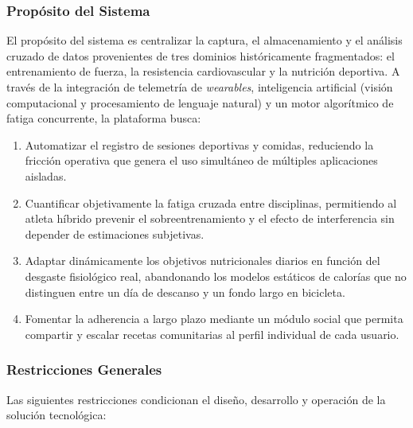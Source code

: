 \documentclass[12pt]{article}
\begin{document}
\subsubsection{Propósito del Sistema}
El propósito del sistema es centralizar la captura, el almacenamiento y el análisis cruzado de datos provenientes de tres dominios históricamente fragmentados: el entrenamiento de fuerza, la resistencia cardiovascular y la nutrición deportiva. A través de la integración de telemetría de \textit{wearables}, inteligencia artificial (visión computacional y procesamiento de lenguaje natural) y un motor algorítmico de fatiga concurrente, la plataforma busca:
\begin{enumerate}
    \item Automatizar el registro de sesiones deportivas y comidas, reduciendo la fricción operativa que genera el uso simultáneo de múltiples aplicaciones aisladas.
    \item Cuantificar objetivamente la fatiga cruzada entre disciplinas, permitiendo al atleta híbrido prevenir el sobreentrenamiento y el efecto de interferencia sin depender de estimaciones subjetivas.
    \item Adaptar dinámicamente los objetivos nutricionales diarios en función del desgaste fisiológico real, abandonando los modelos estáticos de calorías que no distinguen entre un día de descanso y un fondo largo en bicicleta.
    \item Fomentar la adherencia a largo plazo mediante un módulo social que permita compartir y escalar recetas comunitarias al perfil individual de cada usuario.
\end{enumerate}
\newpage
\subsubsection{Restricciones Generales}
Las siguientes restricciones condicionan el diseño, desarrollo y operación de la solución tecnológica:
\end{document}
